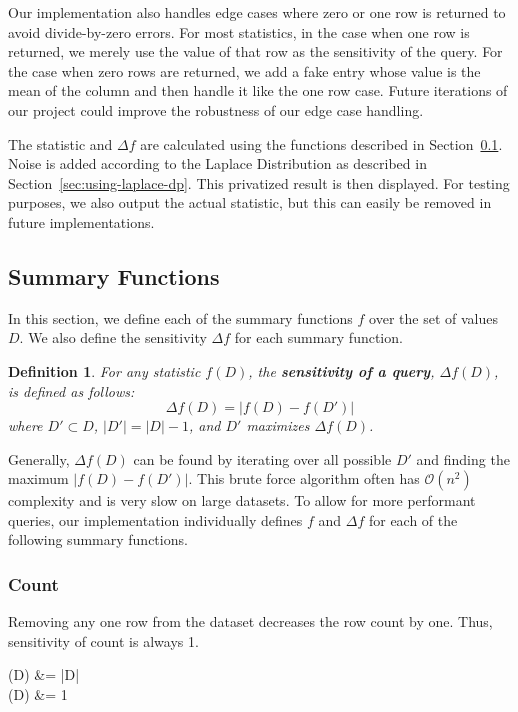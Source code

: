 \documentclass[conference,11pt]{IEEEtran}
\newtheorem{definition}{Definition}
\begin{document}
Our implementation also handles edge cases where zero or one row is returned to
avoid divide-by-zero errors.  For most statistics, in the case when one row is
returned, we merely use the value of that row as the sensitivity of the query.
For the case when zero rows are returned, we add a fake entry whose value is the
mean of the column and then handle it like the one row case. Future iterations
of our project could improve the robustness of our edge case handling.

The statistic and $\Delta f$ are calculated using the functions described in
Section~\ref{sec:summary-functions}. Noise is added according to the Laplace
Distribution as described in Section~\ref{sec:using-laplace-dp}. This privatized
result is then displayed. For testing purposes, we also output the actual
statistic, but this can easily be removed in future implementations.

\subsection{Summary Functions}\label{sec:summary-functions}
In this section, we define each of the summary functions $f$ over the set of
values $D$. We also define the sensitivity $\Delta f$ for each summary function.
\begin{mdframed}
    \begin{definition}
        For any statistic $f(D)$, the \textbf{sensitivity of a query}, $\Delta
        f(D)$, is defined as follows:
        \begin{equation}
            \Delta f(D) = \left|f(D) - f(D')\right|
        \end{equation}
        where $D' \subset D$, $|D'| = |D| - 1$, and $D'$ maximizes $\Delta
        f(D)$.
    \end{definition}
\end{mdframed}

Generally, $\Delta f(D)$ can be found by iterating over all possible $D'$ and
finding the maximum $|f(D) - f(D')|$. This brute force algorithm often has
$\mathcal{O}(n^2)$ complexity and is very slow on large datasets. To allow for
more performant queries, our implementation individually defines $f$ and $\Delta
f$ for each of the following summary functions.

\subsubsection{Count}
Removing any one row from the dataset decreases the row count by one. Thus,
sensitivity of count is always 1.
\begin{equations}
    (D) &= |D| \\
    \Delta{}(D) &= 1
\end{equations}
\end{document}
